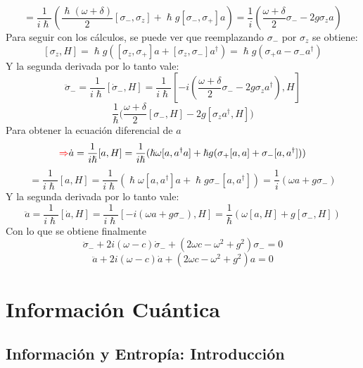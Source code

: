\documentclass{book}
\begin{document}
       \begin{equation}{=\frac{1}{i\hslash}(\frac{\hslash(\omega+\delta)}{2}[\sigma_-,\sigma_z]+\hslash g[\sigma_-,\sigma_+]a)=\frac{1}{i}(\frac{\omega+\delta}{2}\sigma_--2 g\sigma_za)} \end{equation}
       Para seguir con los cálculos, se puede ver que reemplazando ${\sigma_-}$ por ${\sigma_z}$ se obtiene:
       \begin{equation}{ [\sigma_z,H]=\hslash g([\sigma_z,\sigma_+]a+[\sigma_z,\sigma_-]a^\dag)=\hslash g(\sigma_+ a-\sigma_- a^\dag)} \end{equation}
       Y la segunda derivada por lo tanto vale: 
       \begin{equation}{ \ddot{\sigma}_-=\frac{1}{i\hslash}[\dot{\sigma}_-, H]=\frac{1}{i\hslash}[-i(\frac{\omega+\delta}{2}\sigma_--2g\sigma_za^\dag), H]} \end{equation}
       \begin{equation}{ \frac{1}{\hslash}(\frac{\omega+\delta}{2}[\sigma_-,H]-2g[\sigma_za^\dag,H]} )\end{equation}
       Para obtener la ecuación diferencial de ${a}$ \begin{equation}{ \textcolor{red}{\Rightarrow} \dot{a}=\frac{1}{i\hslash}[a,H]=\frac{1}{i\hslash}(\hslash\omega[a,a^\dag a]+\hslash g(\sigma_+[a,a]+\sigma_-[a,a^\dag]))} \end{equation}
       \begin{equation}{=\frac{1}{i\hslash}[a,H]=\frac{1}{i\hslash}(\hslash\omega[a,a^\dag]a+\hslash g\sigma_-[a,a^\dag])=\frac{1}{i}(\omega a+ g\sigma_-)} \end{equation}
       Y la segunda derivada por lo tanto vale:
       \begin{equation}{ \ddot{a}=\frac{1}{i\hslash}[\dot{a},H]=\frac{1}{i\hslash}[-i(\omega a+g\sigma_-),H]=\frac{1}{\hslash}(\omega[a,H]+g[\sigma_-,H])} \end{equation}
       Con lo que se obtiene finalmente       \begin{equation}{\ddot{\sigma}_-+2i(\omega-c)\dot{\sigma}_-+(2\omega c-\omega^2+g^2)\sigma_-=0}\end{equation}
        \begin{equation}{ \ddot{a}+2i(\omega-c)\dot{a}+(2\omega c-\omega^2+g^2)a=0} \end{equation} 
\chapter{Información Cuántica}
\section{Información y Entropía: Introducción}
\end{document}

